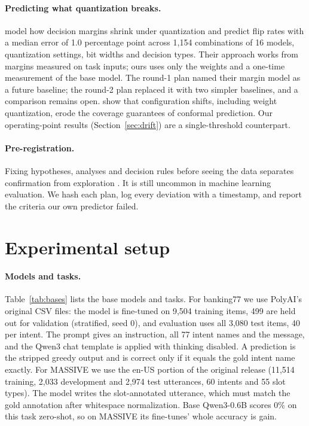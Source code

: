 \documentclass[11pt,letterpaper]{article}
\begin{document}
\paragraph{Predicting what quantization breaks.} \citet{wu2026decisions} model how decision margins shrink under quantization and predict flip rates with a median error of 1.0 percentage point across 1,154 combinations of 16 models, quantization settings, bit widths and decision types. Their approach works from margins measured on task inputs; ours uses only the weights and a one-time measurement of the base model. The round-1 plan named their margin model as a future baseline; the round-2 plan replaced it with two simpler baselines, and a comparison remains open. \citet{zhu2026conformal} show that configuration shifts, including weight quantization, erode the coverage guarantees of conformal prediction. Our operating-point results (Section~\ref{sec:drift}) are a single-threshold counterpart.

\paragraph{Pre-registration.} Fixing hypotheses, analyses and decision rules before seeing the data separates confirmation from exploration \citep{nosek2018prereg}. It is still uncommon in machine learning evaluation. We hash each plan, log every deviation with a timestamp, and report the criteria our own predictor failed.

\section{Experimental setup}
\label{sec:setup}

\paragraph{Models and tasks.} Table~\ref{tab:bases} lists the base models and tasks. For banking77 we use PolyAI's original CSV files: the model is fine-tuned on 9,504 training items, 499 are held out for validation (stratified, seed 0), and evaluation uses all 3,080 test items, 40 per intent. The prompt gives an instruction, all 77 intent names and the message, and the Qwen3 chat template is applied with thinking disabled. A prediction is the stripped greedy output and is correct only if it equals the gold intent name exactly. For MASSIVE we use the en-US portion of the original release (11,514 training, 2,033 development and 2,974 test utterances, 60 intents and 55 slot types). The model writes the slot-annotated utterance, which must match the gold annotation after whitespace normalization. Base Qwen3-0.6B scores 0\% on this task zero-shot, so on MASSIVE its fine-tunes' whole accuracy is gain.
\end{document}
